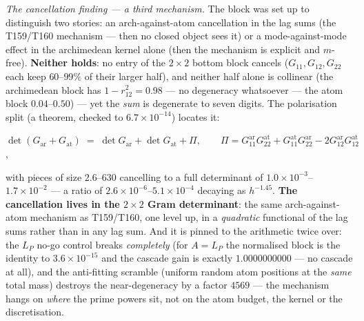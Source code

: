 \documentclass[11pt,a4paper]{article}
\begin{document}
\emph{The cancellation finding --- a third mechanism.} The block was set up
to distinguish two stories: an arch-against-atom cancellation in the lag sums
(the T159/T160 mechanism --- then no closed object sees it) or a
mode-against-mode effect in the archimedean kernel alone (then the mechanism
is explicit and $m$-free). \textbf{Neither holds}: no entry of the $2\times2$
bottom block cancels ($G_{11},G_{12},G_{22}$ each keep $60$--$99\%$ of their
larger half), and neither half alone is collinear (the archimedean block has
$1-r_{12}^2=0.98$ --- no degeneracy whatsoever --- the atom block
$0.04$--$0.50$) --- yet the \emph{sum} is degenerate to seven digits. The
polarisation split (a theorem, checked to $6.7\times10^{-14}$) locates it:
\begin{keyeq}$\displaystyle
\det(G_{\mathrm{ar}}+G_{\mathrm{at}})\;=\;\det G_{\mathrm{ar}}
+\det G_{\mathrm{at}}+\Pi,\qquad
\Pi=G^{\mathrm{ar}}_{11}G^{\mathrm{at}}_{22}
+G^{\mathrm{at}}_{11}G^{\mathrm{ar}}_{22}
-2G^{\mathrm{ar}}_{12}G^{\mathrm{at}}_{12}$,
\end{keyeq}
\noindent with pieces of size $2.6$--$630$ cancelling to a full determinant
of $1.0\times10^{-3}$--$1.7\times10^{-2}$ --- a ratio of
$2.6\times10^{-6}$--$5.1\times10^{-4}$ decaying as $h^{-1.45}$.
\textbf{The cancellation lives in the $2\times2$ Gram determinant}: the same
arch-against-atom mechanism as T159/T160, one level up, in a
\emph{quadratic} functional of the lag sums rather than in any lag sum. And
it is pinned to the arithmetic twice over: the $L_P$ no-go control breaks
\emph{completely} (for $A=L_P$ the normalised block is the identity to
$3.6\times10^{-15}$ and the cascade gain is exactly
$1.0000000000$ --- no cascade at all), and the anti-fitting scramble
(uniform random atom positions at the \emph{same} total mass) destroys the
near-degeneracy by a factor $4569$ --- the mechanism hangs on \emph{where}
the prime powers sit, not on the atom budget, the kernel or the
discretisation.
\end{document}
